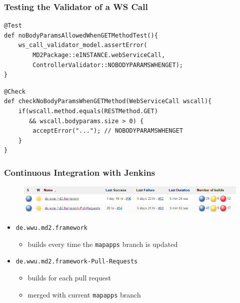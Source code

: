 \begin{frame}[fragile]
\frametitle{Testing the Validator of a WS Call}

\begin{lstlisting}
@Test
def noBodyParamsAllowedWhenGETMethodTest(){
    ws_call_validator_model.assertError(
        MD2Package::eINSTANCE.webServiceCall,
        ControllerValidator::NOBODYPARAMSWHENGET);
}
\end{lstlisting}

\vfill

\begin{lstlisting}
@Check
def checkNoBodyParamsWhenGETMethod(WebServiceCall wscall){
    if(wscall.method.equals(RESTMethod.GET) 
       && wscall.bodyparams.size > 0) {
        acceptError("..."); // NOBODYPARAMSWHENGET
    }
}
\end{lstlisting}

\end{frame}


\begin{frame}
    \frametitle{Continuous Integration with Jenkins}
    
    \begin{figure}
    	\includegraphics[width= 0.9\linewidth]{images/jenkins-jobs.png}
    \end{figure}
    
    \vspace{-1ex}
    
    \begin{itemize}
       \item \texttt{de.wwu.md2.framework}
       \begin{itemize}
           \item builds every time the \texttt{mapapps} branch is updated
       \end{itemize}
       \item \texttt{de.wwu.md2.framework-Pull-Requests} 
       \begin{itemize}
           \item builds for each pull request
           \item merged with current \texttt{mapapps} branch
       \end{itemize}
    \end{itemize}
\end{frame}

